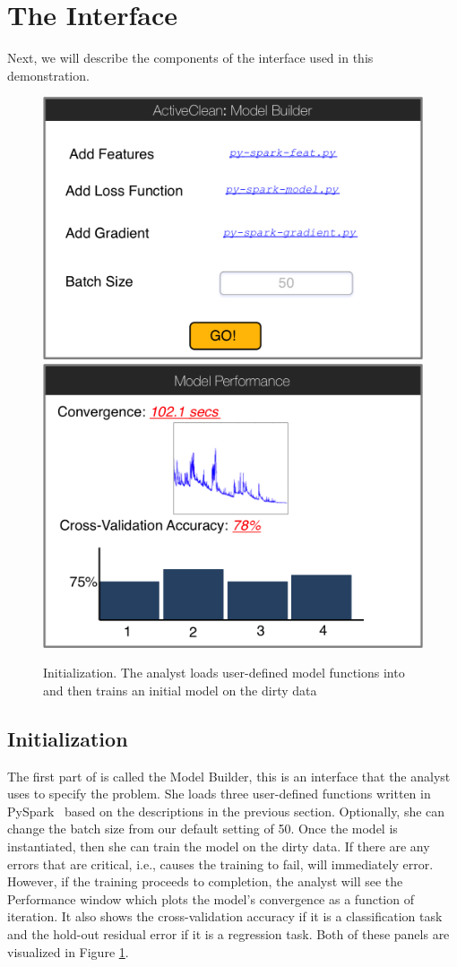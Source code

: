 \section{The Interface}
Next, we will describe the components of the \sys interface used in this demonstration. 

\begin{figure}[t]
\centering
 \includegraphics[width=0.48\columnwidth]{figs/interface1.png}
 \includegraphics[width=0.48\columnwidth]{figs/interface2.png}
 \caption{Initialization. The analyst loads user-defined model functions into \sys and then trains an initial model on the dirty data \label{irun}}
\end{figure}

\subsection{Initialization}
The first part of \sys is called the \textsf{Model Builder}, this is an interface that the analyst uses to specify the problem.
She loads three user-defined functions written in PySpark~\cite{pyspark} based on the descriptions in the previous section.
Optionally, she can change the batch size from our default setting of 50.
Once the model is instantiated, then she can train the model on the dirty data.
If there are any errors that are critical, i.e., causes the training to fail, \sys will immediately error.
However, if the training proceeds to completion, the analyst will see the \textsf{Performance} window which plots the model's convergence as a function of iteration.
It also shows the cross-validation accuracy if it is a classification task and the hold-out residual error if it is a regression task.
Both of these panels are visualized in Figure \ref{irun}.

